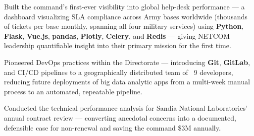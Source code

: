


\begin{rExperience}

  \item Built the command's first-ever visibility into global help-desk performance --- a dashboard visualizing SLA
    compliance across Army bases worldwide (thousands of tickets per base monthly, spanning all four military services)
    using \textbf{Python}, \textbf{Flask}, \textbf{Vue.js}, \textbf{pandas}, \textbf{Plotly}, \textbf{Celery}, and
    \textbf{Redis} --- giving NETCOM leadership quantifiable insight into their primary mission for the first time.

  \item Pioneered DevOps practices within the Directorate --- introducing \textbf{Git}, \textbf{GitLab}, and CI/CD
    pipelines to a geographically distributed team of ~9 developers, reducing future deployments of big data analytic
    apps from a multi-week manual process to an automated, repeatable pipeline.

  \item Conducted the technical performance analysis for Sandia National Laboratories' annual contract review ---
    converting anecdotal concerns into a documented, defensible case for non-renewal and saving the command \$3M annually.



\end{rExperience}
